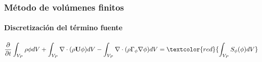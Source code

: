 

\begin{frame}
    \frametitle{M\'etodo de vol\'umenes finitos}
    \framesubtitle{Discretizaci\'on del t\'ermino fuente}
    
    \vspace*{-0.1cm}
    \begin{block}{}
        \footnotesize
        \begin{equation*}
           \frac{\partial}{\partial t} \int_{V_{P}}\rho \phi dV + 
             \int_{V_{P}}\nabla \cdot (\rho \mathbf{U} \phi) dV  - 
             \int_{V_{P}}\nabla \cdot (\rho \Gamma_{\phi} \nabla \phi) dV =  
             \textcolor{red}{ \int_{V_{P}}S_{\phi}(\phi) dV}
        \end{equation*}
    \end{block}     
    
    
    \begin{columns}
            

\end{columns}
\end{frame}
